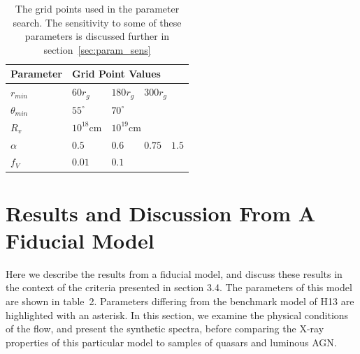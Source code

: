 \documentclass[useAMS,usenatbib]{mn2e_x}
\begin{document}
\begin{table}
\begin{tabular}{p{2cm}p{1cm}p{1cm}p{1cm}p{1cm}}
Parameter & \multicolumn{4}{|l|}{Grid Point Values}  \\
\hline \hline 
$r_{min}$ 	&	 $60r_{g}$ & $180r_{g}$ & \multicolumn{2}{|l|}{$300r_{g}$} \\ 
$\theta_{min}$ 	& $55^{\circ}$ & \multicolumn{3}{|l|}{$70^{\circ}$} \\ 
$R_v$  	        &	 $10^{18}$cm & \multicolumn{3}{|l|}{$10^{19}$cm} \\ 
$\alpha$ 	&	 $0.5$ & $0.6$ & $0.75$ & $1.5$ \\
$f_V$ 	&	 $0.01$ & \multicolumn{3}{|l|}{$0.1$}  \\
\hline 
\end{tabular}
\caption{The grid points used in the parameter search.
The sensitivity to some of these parameters is discussed 
further in section~\ref{sec:param_sens}}
\label{grid_table}
\end{table}







\section{Results and Discussion From A Fiducial Model}
Here we describe the results from a fiducial model,
and discuss these results in the context of the criteria 
presented in section 3.4. The parameters of this model are shown in table~2.
Parameters differing from the benchmark model of H13 are 
highlighted with an asterisk. In this section, we examine the physical 
conditions of the flow, and present the synthetic spectra, before comparing
the X-ray properties of this particular model to samples of
quasars and luminous AGN. 
\end{document}
